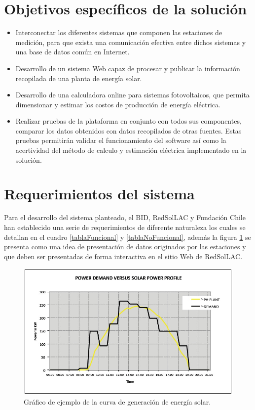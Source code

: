\section{Objetivos específicos de la solución}
\begin{itemize}
\item Interconectar los diferentes sistemas que componen las estaciones de medición, para que exista una comunicación efectiva entre dichos sistemas y una base de datos común en Internet.
\item Desarrollo de un sistema Web capaz de procesar y publicar la información recopilada de una planta de energía solar.
\item Desarrollo de una calculadora online para sistemas fotovoltaicos, que permita dimensionar y estimar los costos de producción de energía eléctrica.
\item Realizar pruebas de la plataforma en conjunto con todos sus componentes, comparar los datos obtenidos con datos recopilados de otras fuentes. Estas pruebas permitirán validar el funcionamiento del software así como la acertividad del método de calculo y estimación eléctrica implementado en la solución.
\end{itemize}

\section{Requerimientos del sistema}
Para el desarrollo del sistema planteado, el BID, RedSolLAC y Fundación Chile han establecido una serie de requerimientos de diferente naturaleza los cuales se detallan en el cuadro \ref{tablaFuncional} y \ref{tablaNoFuncional}, además la figura \ref{fig:demanda} se presenta como una idea de presentación de datos originados por las estaciones y que deben ser presentadas de forma interactiva en el sitio Web de RedSolLAC.

\begin{figure}[h!]
        \centering
        \includegraphics[scale=0.35]{images/demandaGeneracionSubSole}
        \caption{Gráfico de ejemplo de la curva de generación de energía solar.}
	\label{fig:demanda}
\end{figure}
\newpage

